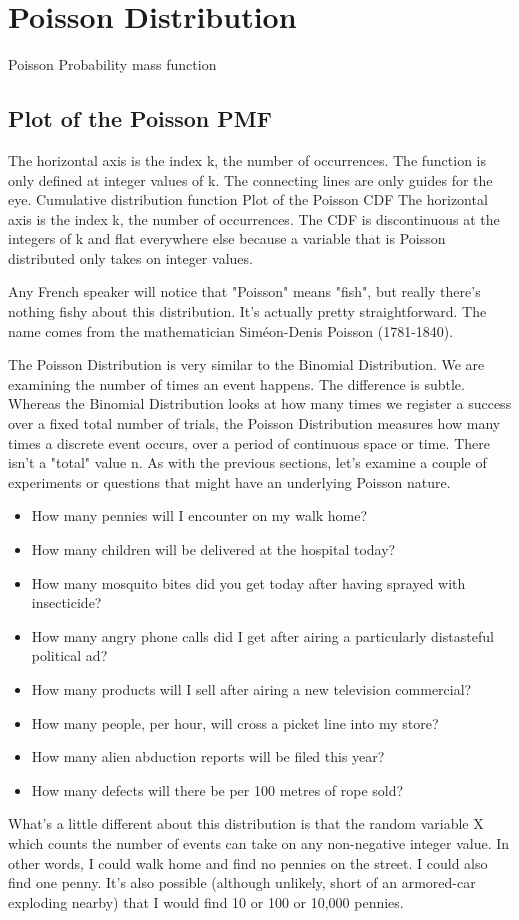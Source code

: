 \documentclass[a4paper,12pt]{article}
\begin{document}
\section{Poisson Distribution}
Poisson
Probability mass function
\subsection{Plot of the Poisson PMF}
The horizontal axis is the index k, the number of occurrences. The function is only defined at integer values of k. The connecting lines are only guides for the eye.
Cumulative distribution function
Plot of the Poisson CDF
The horizontal axis is the index k, the number of occurrences. The CDF is discontinuous at the integers of k and flat everywhere else because a variable that is Poisson distributed only takes on integer values.

Any French speaker will notice that "Poisson" means "fish", but really there's nothing fishy about this distribution. It's actually pretty straightforward. The name comes from the mathematician Siméon-Denis Poisson (1781-1840).

The Poisson Distribution is very similar to the Binomial Distribution. We are examining the number of times an event happens. The difference is subtle. Whereas the Binomial Distribution looks at how many times we register a success over a fixed total number of trials, the Poisson Distribution measures how many times a discrete event occurs, over a period of continuous space or time. There isn't a "total" value n. As with the previous sections, let's examine a couple of experiments or questions that might have an underlying Poisson nature.
\begin{itemize}
\item How many pennies will I encounter on my walk home?
\item How many children will be delivered at the hospital today?
\item How many mosquito bites did you get today after having sprayed with insecticide?
\item How many angry phone calls did I get after airing a particularly distasteful political ad?
\item How many products will I sell after airing a new television commercial?
\item How many people, per hour, will cross a picket line into my store?
\item How many alien abduction reports will be filed this year?
\item How many defects will there be per 100 metres of rope sold?
\end{itemize}
What's a little different about this distribution is that the random variable X which counts the number of events can take on any non-negative integer value. In other words, I could walk home and find no pennies on the street. I could also find one penny. It's also possible (although unlikely, short of an armored-car exploding nearby) that I would find 10 or 100 or 10,000 pennies.
\end{document}
